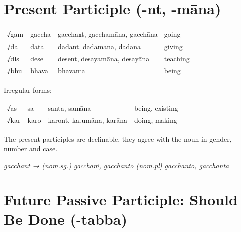 \documentclass[a4paper]{memoir}
\begin{document}
\clearpage

\section{Present Participle (-nt, -māna)}
\label{sec:org9d2337c}

\begin{center}
\begin{tabular}{llll}
√gam & gaccha & gacchant, gacchamāna, gacchāna & going\\[0pt]
√dā & data & dadant, dadamāna, dadāna & giving\\[0pt]
√dis & dese & desent, desayamāna, desayāna & teaching\\[0pt]
√bhū & bhava & bhavanta & being\\[0pt]
\end{tabular}
\end{center}

{\centering

Irregular forms:

\par}

\begin{center}
\begin{tabular}{llll}
√as & sa & santa, samāna & being, existing\\[0pt]
√kar & karo & karont, karumāna, karāna & doing, making\\[0pt]
\end{tabular}
\end{center}

The present participles are declinable, they agree with the noun in gender, number and case.

\emph{gacchant → (nom.sg.) gacchaṁ, gacchanto (nom.pl) gacchanto, gacchantā}

\section{Future Passive Participle: Should Be Done (-tabba)}
\label{sec:org848ba79}
\end{document}
